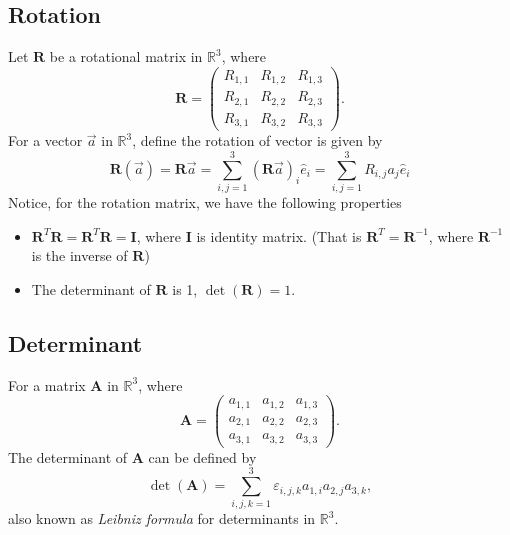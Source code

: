\documentclass[12pt]{article}
\begin{document}
\subsection{Rotation}
Let $\mathbf{R}$ be a rotational matrix in $\mathbb{R}^3$, where 
\begin{equation}
\mathbf{R} = 
\begin{pmatrix}
R_{1,1} & R_{1,2} & R_{1,3}\\
R_{2,1} & R_{2,2} & R_{2,3}\\
R_{3,1} & R_{3,2} & R_{3,3}
\end{pmatrix}.
\end{equation}
For a vector $\vec{a}$ in $\mathbb{R}^3$, define the rotation of vector is given by
\begin{equation}
\mathbf{R}\left(\vec{a}\right) = \mathbf{R} \vec{a} = \sum_{i,j=1}^{3} \left(\mathbf{R}\vec{a}\right)_i \hat{e}_{i} = \sum_{i,j=1}^{3} R_{i,j} a_{j} \hat{e}_{i}
\label{eq:def-rotation-matrix}
\end{equation}
Notice, for the rotation matrix, we have the following properties
\begin{itemize}
\item $\mathbf{R}^{T}\mathbf{R} = \mathbf{R}^{T}\mathbf{R} = \mathbf{I}$, where $\mathbf{I}$ is identity matrix. (That is $\mathbf{R}^{T} = \mathbf{R}^{-1}$, where $\mathbf{R}^{-1}$ is the inverse of $\mathbf{R}$)
\item The determinant of $\mathbf{R}$ is 1, $\det(\mathbf{R}) = 1$.
\end{itemize}


\subsection{Determinant}
For a matrix $\mathbf{A}$ in $\mathbb{R}^3$, where
\begin{equation}
\mathbf{A} = 
\begin{pmatrix}
a_{1,1} & a_{1,2} & a_{1,3}\\
a_{2,1} & a_{2,2} & a_{2,3}\\
a_{3,1} & a_{3,2} & a_{3,3}
\end{pmatrix}.
\end{equation}
The determinant of $\mathbf{A}$ can be defined by
\begin{equation}
\det(\mathbf{A}) = \sum_{i,j,k=1}^{3} \varepsilon_{i,j,k} a_{1,i}a_{2,j}a_{3,k},
\label{eq:def-determinant}
\end{equation}
also known as {\it Leibniz formula} for determinants in $\mathbb{R}^3$.
\end{document}
